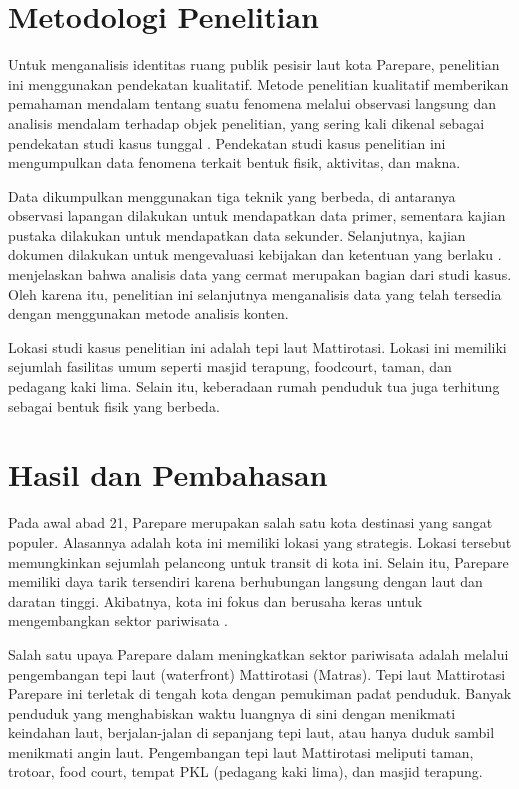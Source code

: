 \documentclass[11pt]{simart} %
\begin{document}
% 

\section{Metodologi Penelitian}
Untuk menganalisis identitas ruang publik pesisir laut kota Parepare, penelitian ini menggunakan pendekatan kualitatif. Metode penelitian kualitatif memberikan pemahaman mendalam tentang suatu fenomena melalui observasi langsung dan analisis mendalam terhadap objek penelitian, yang sering kali dikenal sebagai pendekatan studi kasus tunggal \citep{creswell2016}. Pendekatan studi kasus penelitian ini mengumpulkan data fenomena terkait bentuk fisik, aktivitas, dan makna.

Data dikumpulkan menggunakan tiga teknik yang berbeda, di antaranya observasi lapangan dilakukan untuk mendapatkan data primer, sementara kajian pustaka dilakukan untuk mendapatkan data sekunder. Selanjutnya, kajian dokumen dilakukan untuk mengevaluasi kebijakan dan ketentuan yang berlaku \citep{iqbal2020}. \cite{wiraguna2024} menjelaskan bahwa analisis data yang cermat merupakan bagian dari studi kasus. Oleh karena itu, penelitian ini selanjutnya menganalisis data yang telah tersedia dengan menggunakan metode analisis konten.

Lokasi studi kasus penelitian ini adalah tepi laut Mattirotasi. Lokasi ini memiliki sejumlah fasilitas umum seperti masjid terapung, foodcourt, taman, dan pedagang kaki lima. Selain itu, keberadaan rumah penduduk tua juga terhitung sebagai bentuk fisik yang berbeda.

\section{Hasil dan Pembahasan}%

Pada awal abad 21, Parepare merupakan salah satu kota destinasi yang sangat populer. Alasannya adalah kota ini memiliki lokasi yang strategis. Lokasi tersebut memungkinkan sejumlah pelancong untuk transit di kota ini. Selain itu, Parepare memiliki daya tarik tersendiri karena berhubungan langsung dengan laut dan daratan tinggi. Akibatnya, kota ini fokus dan berusaha keras untuk mengembangkan sektor pariwisata \citep{faniapriani2018}.

Salah satu upaya Parepare dalam meningkatkan sektor pariwisata adalah melalui pengembangan tepi laut (waterfront) Mattirotasi (Matras). Tepi laut Mattirotasi Parepare ini terletak di tengah kota dengan pemukiman padat penduduk. Banyak penduduk yang menghabiskan waktu luangnya di sini dengan menikmati keindahan laut, berjalan-jalan di sepanjang tepi laut, atau hanya duduk sambil menikmati angin laut. Pengembangan tepi laut Mattirotasi meliputi taman, trotoar, food court, tempat PKL (pedagang kaki lima), dan masjid terapung.
\end{document}

